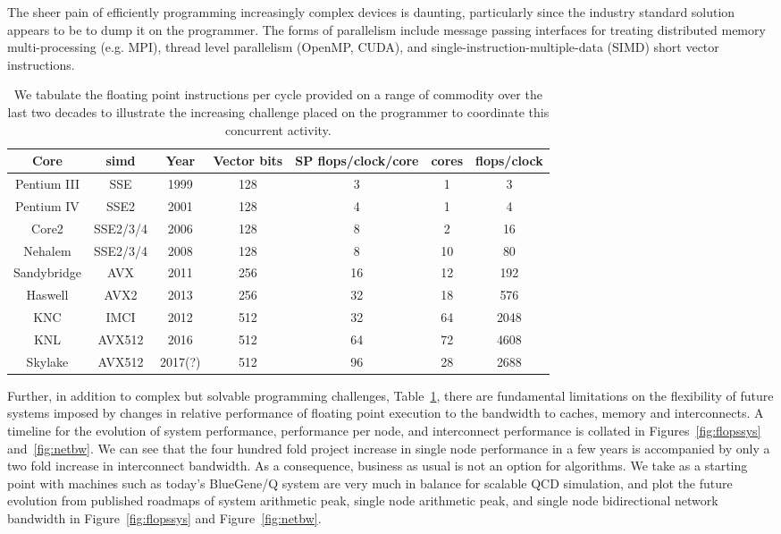 \documentclass{PoS}
\begin{document}
The sheer pain of efficiently programming increasingly complex devices is daunting, particularly
since the industry standard solution appears to be to dump it on the programmer.
The forms of parallelism include message passing interfaces for treating distributed memory multi-processing
(e.g. MPI), thread level parallelism (OpenMP, CUDA), and single-instruction-multiple-data (SIMD) short vector
instructions.
\begin{table}[hbt]
\begin{tabular}{ccccccc}
Core & simd &Year & Vector bits & SP flops/clock/core & cores & flops/clock\\
\hline
Pentium III& SSE    &1999 & 128 & 3 & 1 & 3\\
Pentium IV & SSE2   &2001 & 128 & 4 & 1 & 4\\
Core2        & SSE2/3/4 &2006 & 128 & 8 & 2 & 16\\
Nehalem      & SSE2/3/4 &2008 & 128 & 8 & 10 & 80\\
Sandybridge & AVX &2011  & 256 & 16 & 12 & 192\\
Haswell &AVX2     &2013 & 256 & 32 & 18 & 576\\
KNC & IMCI    &2012 & 512 & 32 & 64 & 2048\\
KNL & AVX512  &2016 & 512 & 64 & 72 & 4608\\
Skylake &AVX512 & 2017(?) & 512 & 96 & 28 & 2688
\end{tabular}
\caption{
\label{tab:chips}
We tabulate the floating point instructions per cycle provided on a range of commodity over the last two decades
to illustrate the increasing challenge placed on the programmer to coordinate this concurrent activity.
}
\end{table}

Further, in addition to complex but solvable programming challenges, Table~\ref{tab:chips}, there are fundamental limitations
on the flexibility of future systems imposed by changes in relative performance of floating point execution to the
bandwidth to caches, memory and interconnects. A timeline for the evolution of system performance, performance per node,
and interconnect performance is collated in Figures~\ref{fig:flopssys} and~\ref{fig:netbw}. We can see that
the four hundred fold project increase in single node performance in a few years is accompanied by only
a two fold increase in interconnect bandwidth. As a consequence, business as usual is not an option for algorithms.
We take as a starting point with machines such as today's BlueGene/Q system are very much in balance for scalable QCD simulation,
and plot the future evolution from published roadmaps 
of system arithmetic peak, single node arithmetic peak, and single node bidirectional network bandwidth in Figure~\ref{fig:flopssys}
and Figure~\ref{fig:netbw}.
\end{document}
